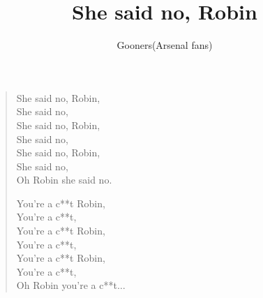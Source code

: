 \documentclass[a4paper,12pt]{article}
\title{She said no, Robin}
\author{Gooners(Arsenal fans)}
\date{}
\begin{document}
	
	\maketitle
	
	\begin{verse}
		
		She said no, Robin, \\
		She said no, \\
		She said no, Robin, \\ 
		She said no, \\
		She said no, Robin, \\ 
		She said no, \\
		Oh Robin she said no.\par 		
		You're a c**t Robin, \\ 
		You're a c**t, \\
		You're a c**t Robin, \\ 
		You're a c**t, \\
		You're a c**t Robin, \\ 
		You're a c**t, \\
		Oh Robin you're a c**t$\ldots$
		
	\end{verse}
	
\end{document}
